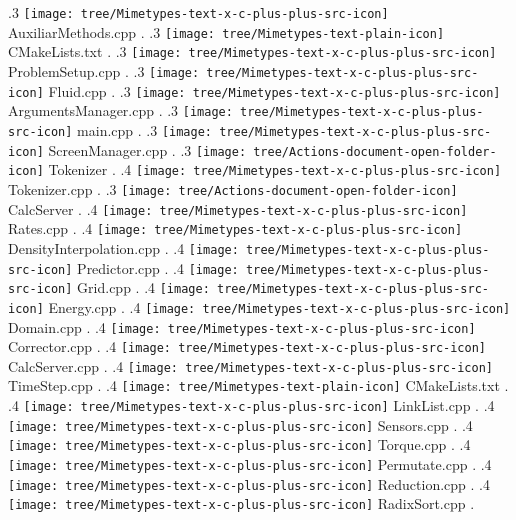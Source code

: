 {.3 { \texttt{[image: tree/Mimetypes-text-x-c-plus-plus-src-icon]} AuxiliarMethods.cpp }.
.3 { \texttt{[image: tree/Mimetypes-text-plain-icon]} CMakeLists.txt }.
.3 { \texttt{[image: tree/Mimetypes-text-x-c-plus-plus-src-icon]} ProblemSetup.cpp }.
.3 { \texttt{[image: tree/Mimetypes-text-x-c-plus-plus-src-icon]} Fluid.cpp }.
.3 { \texttt{[image: tree/Mimetypes-text-x-c-plus-plus-src-icon]} ArgumentsManager.cpp }.
.3 { \texttt{[image: tree/Mimetypes-text-x-c-plus-plus-src-icon]} main.cpp }.
.3 { \texttt{[image: tree/Mimetypes-text-x-c-plus-plus-src-icon]} ScreenManager.cpp }.
.3 { \texttt{[image: tree/Actions-document-open-folder-icon]} Tokenizer }.
.4 { \texttt{[image: tree/Mimetypes-text-x-c-plus-plus-src-icon]} Tokenizer.cpp }.
.3 { \texttt{[image: tree/Actions-document-open-folder-icon]} CalcServer }.
.4 { \texttt{[image: tree/Mimetypes-text-x-c-plus-plus-src-icon]} Rates.cpp }.
.4 { \texttt{[image: tree/Mimetypes-text-x-c-plus-plus-src-icon]} DensityInterpolation.cpp }.
.4 { \texttt{[image: tree/Mimetypes-text-x-c-plus-plus-src-icon]} Predictor.cpp }.
.4 { \texttt{[image: tree/Mimetypes-text-x-c-plus-plus-src-icon]} Grid.cpp }.
.4 { \texttt{[image: tree/Mimetypes-text-x-c-plus-plus-src-icon]} Energy.cpp }.
.4 { \texttt{[image: tree/Mimetypes-text-x-c-plus-plus-src-icon]} Domain.cpp }.
.4 { \texttt{[image: tree/Mimetypes-text-x-c-plus-plus-src-icon]} Corrector.cpp }.
.4 { \texttt{[image: tree/Mimetypes-text-x-c-plus-plus-src-icon]} CalcServer.cpp }.
.4 { \texttt{[image: tree/Mimetypes-text-x-c-plus-plus-src-icon]} TimeStep.cpp }.
.4 { \texttt{[image: tree/Mimetypes-text-plain-icon]} CMakeLists.txt }.
.4 { \texttt{[image: tree/Mimetypes-text-x-c-plus-plus-src-icon]} LinkList.cpp }.
.4 { \texttt{[image: tree/Mimetypes-text-x-c-plus-plus-src-icon]} Sensors.cpp }.
.4 { \texttt{[image: tree/Mimetypes-text-x-c-plus-plus-src-icon]} Torque.cpp }.
.4 { \texttt{[image: tree/Mimetypes-text-x-c-plus-plus-src-icon]} Permutate.cpp }.
.4 { \texttt{[image: tree/Mimetypes-text-x-c-plus-plus-src-icon]} Reduction.cpp }.
.4 { \texttt{[image: tree/Mimetypes-text-x-c-plus-plus-src-icon]} RadixSort.cpp }.
}
